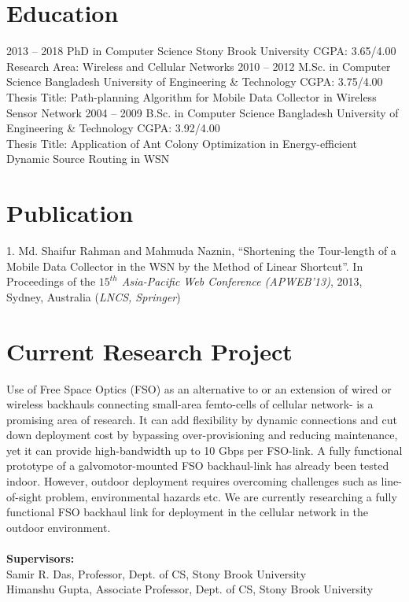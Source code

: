\documentclass[]{friggeri-cv} %
\begin{document}
\section{Education}
\begin{entrylist} 
\entry
{2013 -- 2018}
{PhD in Computer Science}
{Stony Brook University}
{CGPA: 3.65/4.00\\  Research Area: Wireless and Cellular Networks}
\entry
{2010 -- 2012}
{M.Sc. in  Computer Science}
{Bangladesh University of Engineering \& Technology}
{CGPA: 3.75/4.00\\ 
Thesis Title: Path-planning Algorithm for Mobile Data Collector in Wireless
Sensor Network}
\entry  
{2004 -- 2009}
{B.Sc. in  Computer Science}
{Bangladesh University of Engineering \& Technology}
{CGPA: 3.92/4.00\\ 
Thesis Title: Application of Ant Colony Optimization in Energy-efficient Dynamic
Source Routing in WSN}
\end{entrylist}
\section{Publication}
1. Md. Shaifur Rahman and Mahmuda Naznin, ``Shortening the Tour-length of a Mobile Data Collector
  in the WSN by the Method of Linear Shortcut''. In Proceedings of the
  \textit{$15^{th}$ Asia-Pacific Web Conference (APWEB'13)}, 2013, Sydney,
  Australia (\textit{LNCS, Springer})
\section{Current Research Project}
Use of Free Space Optics (FSO) as an alternative to or an extension of wired or
wireless backhauls connecting small-area femto-cells of cellular network- is a
promising area of research. It can add flexibility by dynamic connections and 
cut down deployment cost by bypassing over-provisioning and reducing
maintenance, yet it can provide high-bandwidth up to 10 Gbps per FSO-link.
A fully functional prototype of a galvomotor-mounted FSO backhaul-link has
 already been tested
indoor. However, outdoor deployment requires overcoming challenges such as
line-of-sight problem, environmental hazards etc. We are currently
researching a fully functional  FSO backhaul link for deployment in the cellular
network in the outdoor environment.\\ \\
\textbf{Supervisors:} \\
\bullet{ } Samir R. Das, Professor, Dept. of CS, Stony Brook University\\
\bullet{ } Himanshu Gupta, Associate Professor, Dept. of CS, Stony Brook
University
\end{document}
